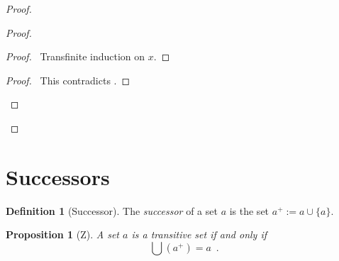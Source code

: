 \documentclass{book}
\let\qed\relax
\newtheorem{prop}[ax]{Proposition}
\theoremstyle{definition}
\newtheorem{df}[ax]{Definition}
\begin{document}
\begin{proof}
\begin{proof}
	\begin{proof}
		\pf\ Transfinite induction on $x$.
	\end{proof}
	\qedstep
	\begin{proof}
		\pf\ This contradicts .
	\end{proof}
\end{proof}
\qed
\end{proof}

\section{Successors}

\begin{df}[Successor]
The \emph{successor} of a set $a$ is the set $a^+ := a \cup \{a\}$.
\end{df}

\begin{prop}[Z]
\label{prop:Uaplus}
A set $a$ is a transitive set if and only if
\[ \bigcup (a^+) = a \enspace . \]
\end{prop}
\end{document}
